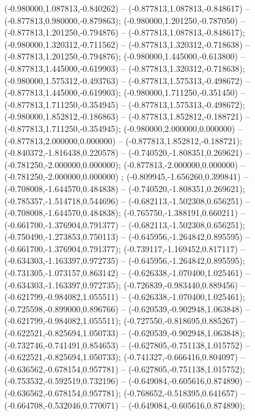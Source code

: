  (-0.980000,1.087813,-0.840262) -- (-0.877813,1.087813,-0.848617) -- (-0.877813,0.980000,-0.879863);
 (-0.980000,1.201250,-0.787050) -- (-0.877813,1.201250,-0.794876) -- (-0.877813,1.087813,-0.848617);
 (-0.980000,1.320312,-0.711562) -- (-0.877813,1.320312,-0.718638) -- (-0.877813,1.201250,-0.794876);
 (-0.980000,1.445000,-0.613800) -- (-0.877813,1.445000,-0.619903) -- (-0.877813,1.320312,-0.718638);
 (-0.980000,1.575312,-0.493763) -- (-0.877813,1.575313,-0.498672) -- (-0.877813,1.445000,-0.619903);
 (-0.980000,1.711250,-0.351450) -- (-0.877813,1.711250,-0.354945) -- (-0.877813,1.575313,-0.498672);
 (-0.980000,1.852812,-0.186863) -- (-0.877813,1.852812,-0.188721) -- (-0.877813,1.711250,-0.354945);
 (-0.980000,2.000000,0.000000) -- (-0.877813,2.000000,0.000000) -- (-0.877813,1.852812,-0.188721);
 (-0.840372,-1.816438,0.220578) -- (-0.740520,-1.808351,0.269621) -- (-0.781250,-2.000000,0.000000);
 (-0.877813,-2.000000,0.000000) -- (-0.781250,-2.000000,0.000000) ;
 (-0.809945,-1.656260,0.399841) -- (-0.708008,-1.644570,0.484838) -- (-0.740520,-1.808351,0.269621);
 (-0.785357,-1.514718,0.544696) -- (-0.682113,-1.502308,0.656251) -- (-0.708008,-1.644570,0.484838);
 (-0.765750,-1.388191,0.660211) -- (-0.661700,-1.376904,0.791377) -- (-0.682113,-1.502308,0.656251);
 (-0.750490,-1.273853,0.750113) -- (-0.645956,-1.264842,0.895595) -- (-0.661700,-1.376904,0.791377);
 (-0.739117,-1.169452,0.817117) -- (-0.634303,-1.163397,0.972735) -- (-0.645956,-1.264842,0.895595);
 (-0.731305,-1.073157,0.863142) -- (-0.626338,-1.070400,1.025461) -- (-0.634303,-1.163397,0.972735);
 (-0.726839,-0.983440,0.889456) -- (-0.621799,-0.984082,1.055511) -- (-0.626338,-1.070400,1.025461);
 (-0.725598,-0.899000,0.896766) -- (-0.620539,-0.902948,1.063848) -- (-0.621799,-0.984082,1.055511);
 (-0.727550,-0.818695,0.885267) -- (-0.622521,-0.825694,1.050733) -- (-0.620539,-0.902948,1.063848);
 (-0.732746,-0.741491,0.854653) -- (-0.627805,-0.751138,1.015752) -- (-0.622521,-0.825694,1.050733);
 (-0.741327,-0.666416,0.804097) -- (-0.636562,-0.678154,0.957781) -- (-0.627805,-0.751138,1.015752);
 (-0.753532,-0.592519,0.732196) -- (-0.649084,-0.605616,0.874890) -- (-0.636562,-0.678154,0.957781);
 (-0.768652,-0.518395,0.641657) -- (-0.664708,-0.532046,0.770071) -- (-0.649084,-0.605616,0.874890);
